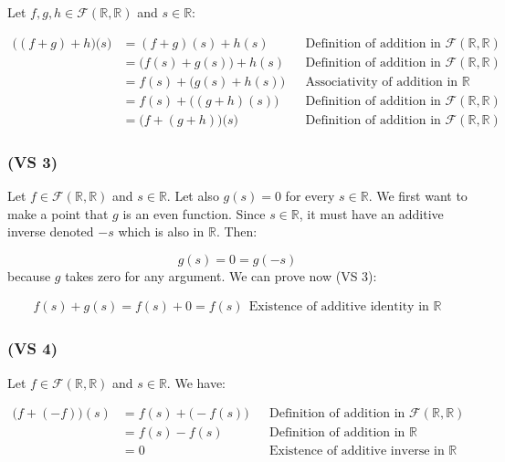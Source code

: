 \documentclass{article}
\begin{document}
Let \(f, g, h \in \mathcal{F}(\mathbb{R}, \mathbb{R})\) and \( s \in \mathbb{R}\):

\begin{align*}
    \Big((f+g) + h\Big)\Big(s\Big) &= (f + g)(s) + h(s) && \text{Definition of addition in \(\mathcal{F}(\mathbb{R}, \mathbb{R})\)} \\
                                   &= \Big(f(s) + g(s)\Big) + h(s) && \text{Definition of addition in \(\mathcal{F}(\mathbb{R}, \mathbb{R})\)} \\
                                   &= f(s) + \Big(g(s) + h(s)\Big) && \text{Associativity of addition in \(\mathbb{R}\)} \\
                                   &= f(s) + \Big((g+h)(s)\Big) && \text{Definition of addition in \(\mathcal{F}(\mathbb{R}, \mathbb{R})\)} \\
                                   &= \Big(f + (g + h)\Big)\Big(s\Big) && \text{Definition of addition in \(\mathcal{F}(\mathbb{R}, \mathbb{R})\)}
\end{align*}

\subsubsection*{(VS 3)}

Let \(f\in \mathcal{F}(\mathbb{R}, \mathbb{R})\) and \( s \in \mathbb{R}\). Let also \(g(s) = 0\) for every \(s \in \mathbb{R}\).
We first want to make a point that \(g\) is an even function. Since \( s \in \mathbb{R}\), it must have an additive inverse denoted \(-s\) which is
also in \(\mathbb{R}\). Then:

\begin{equation*}
    g(s) = 0 = g(-s)
\end{equation*}
because \(g\) takes zero for any argument. We can prove now (VS 3):

\begin{align*}
    f(s) + g(s) = f(s) + 0 =  f(s) \ \  \text{Existence of additive identity in \(\mathbb{R}\)}
\end{align*}

\subsubsection*{(VS 4)}

Let \(f\in \mathcal{F}(\mathbb{R}, \mathbb{R})\) and \( s \in \mathbb{R}\). We have:

\begin{align*}
    \Big(f + (-f)\Big)(s) &= f(s) + \Big(-f(s)\Big) && \text{Definition of addition in \(\mathcal{F}(\mathbb{R}, \mathbb{R})\)} \\
    &= f(s) - f(s) &&  \text{Definition of addition in \(\mathbb{R}\)}  \\
    &= 0 && \text{Existence of additive inverse in \(\mathbb{R}\)}
\end{align*}
\end{document}
